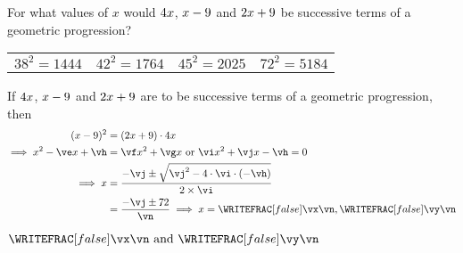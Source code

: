 

\MULTIPLY{}\ve
\MULTIPLY\va\vc\vf
\MULTIPLY\va\vd\vg
\SQUARE\vb\vh

\SUBTRACT{}\vi
\ADD\vg\ve\vj
\MULTIPLY{}\vn

\ADD{-\vj}\vm\vx
\SUBTRACT{-\vj}\vm\vy

\question[2] For what values of $x$ would $4 x$, $x-9$ and $2 x+ 9$ be successive terms 
of a geometric progression?

\watchout

\begin{calcaid}
  \begin{tabular}{c c c c}
    $38^2=1444$ & $42^2=1764$ & $45^2=2025$ & $72^2=5184$ 
  \end{tabular}
\end{calcaid}

\begin{solution}[\halfpage]
	If $4 x$, $x-9$ and $2x+9$ are to be successive terms of a geometric progression, then
	\begin{align}
		(x - \vb)^2 &= (\vc x+\vd)\cdot \va x \\
		\implies x^2-\ve x + \vh &= \vf x^2 + \vg x \text{ or } \vi x^2+\vj x- \vh = 0 \\
		\implies x &= \dfrac{-\vj \pm \sqrt{\vj^2-4\cdot \vi\cdot(-\vh)}}{2\times \vi} \\
		&=  \dfrac{-\vj \pm \vm}\vn\implies x = 
    \WRITEFRAC[false]\vx\vn, \WRITEFRAC[false]\vy\vn 
	\end{align}
\end{solution}

\ifprintanswers
  \begin{codex}
    $\WRITEFRAC[false]\vx\vn\text{ and }\WRITEFRAC[false]\vy\vn$
  \end{codex}
\fi
